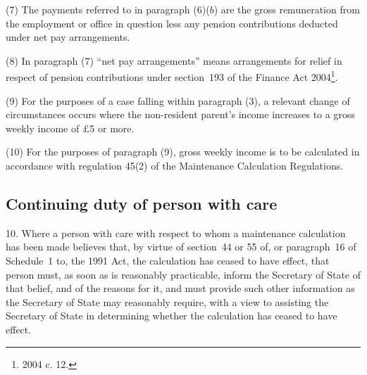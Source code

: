 \documentclass[12pt,a4paper]{article}
\begin{document}
(7) The payments referred to in paragraph (6)($b$)  are the gross remuneration from the employment or office in question less any pension contributions deducted under net pay arrangements.

(8) In paragraph (7) “net pay arrangements” means arrangements for relief in respect of pension contributions under section~193 of the Finance Act 2004\footnote{2004 c. 12.}.

(9) For the purposes of a case falling within paragraph (3), a relevant change of circumstances occurs where the non-resident parent’s income increases to a gross weekly income of 
£5 
or more.

(10) For the purposes of paragraph (9), gross weekly income is to be calculated in accordance with regulation 45(2) of the Maintenance Calculation Regulations.


\subsection[10. Continuing duty of person with care]{Continuing duty of person with care}

10.  Where a person with care with respect to whom a maintenance calculation has been made believes that, by virtue of section~44 or 55 of, or paragraph~16 of Schedule~1 to, the 1991 Act, the calculation has ceased to have effect, that person must, as soon as is reasonably practicable, inform the 
Secretary of State  %
of that belief, and of the reasons for it, and must provide such other information as the 
Secretary of State  %
may reasonably require, with a view to assisting the 
Secretary of State  %
in determining whether the calculation has ceased to have effect.

\end{document}
